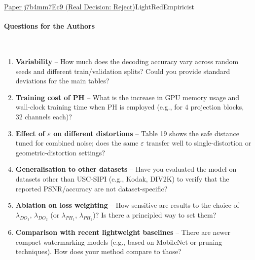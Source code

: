 \documentclass{article} %
\begin{document}
\begin{reviewbox}{\href{https://openreview.net/forum?id=j7b4mm7Ec9}{Paper j7b4mm7Ec9 (Real Decision: Reject)}}{LightRed}{Empiricist}
\paragraph{Questions for the Authors}
\leavevmode\\[0.1em]
\begin{enumerate}[leftmargin=0.5em, itemsep=0pt, topsep=0pt]
    \item \textbf{Variability} – How much does the decoding accuracy vary across random seeds and different train/validation splits? Could you provide standard deviations for the main tables?  
    \item \textbf{Training cost of PH} – What is the increase in GPU memory usage and wall-clock training time when PH is employed (e.g., for 4 projection blocks, 32 channels each)?  
    \item \textbf{Effect of $\varepsilon$ on different distortions} – Table 19 shows the safe distance tuned for combined noise; does the same $\varepsilon$ transfer well to single-distortion or geometric-distortion settings?  
    \item \textbf{Generalisation to other datasets} – Have you evaluated the model on datasets other than USC-SIPI (e.g., Kodak, DIV2K) to verify that the reported PSNR/accuracy are not dataset-specific?  
    \item \textbf{Ablation on loss weighting} – How sensitive are results to the choice of $\lambda_{DO_1}$, $\lambda_{DO_2}$ (or $\lambda_{PH_1}$, $\lambda_{PH_2}$)? Is there a principled way to set them?  
    \item \textbf{Comparison with recent lightweight baselines} – There are newer compact watermarking models (e.g., based on MobileNet or pruning techniques). How does your method compare to those?  
\end{enumerate}


\end{reviewbox}
\end{document}
